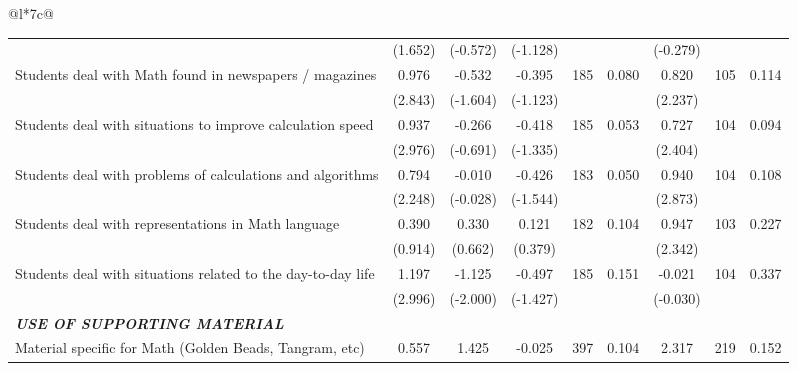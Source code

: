 \documentclass[a4paper, 12pt]{article}
\newcommand{\sym}[1]{\rlap{#1}}%
\begin{document}
\begin{longtable}{@{\extracolsep{1pt}}l*{7}{c}@{}}
\begin{adjustbox}{max width=\textwidth}
\begin{tabular}{l*{8}{c}}
            &     (1.652)         &     (-0.572)         &     (-1.128)         &             &        &     (-0.279)                \\
Students deal with Math found in newspapers / magazines     &       0.976\sym{**} &      -0.532         &      -0.395         &      185         &    0.080 &       0.820\sym{*}         &       105        &   0.114     \\
            &     (2.843)         &     (-1.604)         &     (-1.123)         &              &       &     (2.237)                 \\
Students deal with situations to improve calculation speed     &       0.937\sym{**} &      -0.266         &      -0.418         &   185      &      0.053      &       0.727\sym{*}         &       104        &    0.094       \\
            &     (2.976)         &     (-0.691)         &     (-1.335)         &             &      &     (2.404)                  \\
Students deal with problems of calculations and algorithms     &       0.794\sym{*}  &    -0.010         &      -0.426         &     183         &       0.050        &       0.940\sym{**}         &       104        &        0.108 \\
            &     (2.248)         &     (-0.028)         &     (-1.544)         &              &       &     (2.873)                 \\
Students deal with representations in Math language     &       0.390         &       0.330         &       0.121         &       182         &   0.104        &       0.947\sym{*} &       103        &    0.227     \\
            &     (0.914)         &     (0.662)         &     (0.379)         &              &        &     (2.342)                \\
Students deal with situations related to the day-to-day life     &       1.197\sym{**} &      -1.125\sym{*}  &      -0.497         &     185         &      0.151     &       -0.021         &       104        &        0.337    \\
            &     (2.996)         &     (-2.000)         &     (-1.427)         &             &       &     (-0.030)                 \\
\midrule
\textbf{\emph{USE OF SUPPORTING MATERIAL}}&            &            &            &                     &               \\
Material specific for Math (Golden Beads, Tangram, etc)     &       0.557         &       1.425\sym{**} &     -0.025         &     397         &      0.104    &       2.317\sym{**}         &       219        &     0.152       \\

\end{tabular}
\end{adjustbox}
\end{longtable}
\end{document}
